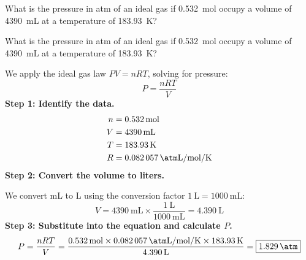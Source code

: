 \begin{exercise}
    What is the pressure in atm of an ideal gas if \qty{0.532}{\mol} occupy a volume of \qty{4390}{\mL} at a temperature of \qty{183.93}{\kelvin}?
    \begin{solu}
        What is the pressure in atm of an ideal gas if \qty{0.532}{\mol} occupy a volume of \qty{4390}{\mL} at a temperature of \qty{183.93}{\kelvin}?

        We apply the ideal gas law $PV = nRT$, solving for pressure:
        \begin{equation*}
            P = \frac{nRT}{V}
        \end{equation*}
        \textbf{Step 1: Identify the data.}
        \begin{align*}
            n &= \qty{0.532}{\mol} \\
            V &= \qty{4390}{\mL} \\
            T &= \qty{183.93}{\kelvin} \\
            R &= \qty{0.082057}{\atm\liter\per\mol\per\kelvin}
        \end{align*}
        \textbf{Step 2: Convert the volume to liters.}

        We convert mL to L using the conversion factor $\qty{1}{\liter} = \qty{1000}{\mL}$:
        \begin{equation*}
            V = \qty{4390}{\mL} \times \frac{\qty{1}{\liter}}{\qty{1000}{\mL}} = \qty{4.390}{\liter}
        \end{equation*}
        \textbf{Step 3: Substitute into the equation and calculate $P$.}
        \begin{equation*}
            P = \frac{nRT}{V} = \frac{\qty{0.532}{\mol} \times \qty{0.082057}{\atm\liter\per\mol\per\kelvin} \times \qty{183.93}{\kelvin}}{\qty{4.390}{\liter}} = \boxed{\qty{1.829}{\atm}}
        \end{equation*}
    \end{solu}
\end{exercise}
